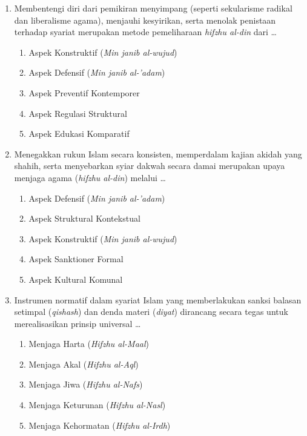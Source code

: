 \documentclass[12pt,a4paper]{article}
\begin{document}
\begin{enumerate}[leftmargin=*]
\item Membentengi diri dari pemikiran menyimpang (seperti sekularisme radikal dan liberalisme agama), menjauhi kesyirikan, serta menolak penistaan terhadap syariat merupakan metode pemeliharaan \textit{hifzhu al-din} dari \dots
    \begin{enumerate}[label=\alph*.]
        \item Aspek Konstruktif (\textit{Min janib al-wujud})
        \item Aspek Defensif (\textit{Min janib al-'adam})
        \item Aspek Preventif Kontemporer
        \item Aspek Regulasi Struktural
        \item Aspek Edukasi Komparatif
    \end{enumerate}

\item Menegakkan rukun Islam secara konsisten, memperdalam kajian akidah yang shahih, serta menyebarkan syiar dakwah secara damai merupakan upaya menjaga agama (\textit{hifzhu al-din}) melalui \dots
    \begin{enumerate}[label=\alph*.]
        \item Aspek Defensif (\textit{Min janib al-'adam})
        \item Aspek Struktural Kontekstual
        \item Aspek Konstruktif (\textit{Min janib al-wujud})
        \item Aspek Sanktioner Formal
        \item Aspek Kultural Komunal
    \end{enumerate}

\item Instrumen normatif dalam syariat Islam yang memberlakukan sanksi balasan setimpal (\textit{qishash}) dan denda materi (\textit{diyat}) dirancang secara tegas untuk merealisasikan prinsip universal \dots
    \begin{enumerate}[label=\alph*.]
        \item Menjaga Harta (\textit{Hifzhu al-Maal})
        \item Menjaga Akal (\textit{Hifzhu al-Aql})
        \item Menjaga Jiwa (\textit{Hifzhu al-Nafs})
        \item Menjaga Keturunan (\textit{Hifzhu al-Nasl})
        \item Menjaga Kehormatan (\textit{Hifzhu al-Irdh})
    \end{enumerate}


\end{enumerate}
\end{document}
